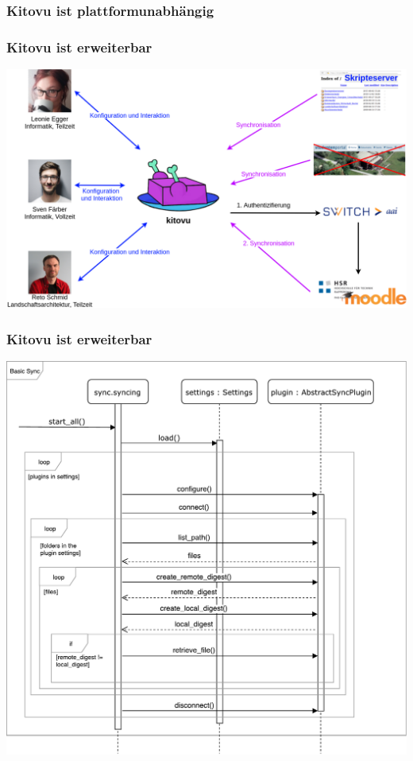 \documentclass{beamer}
\begin{document}
  \begin{frame}
    \frametitle{Kitovu ist plattformunabhängig}
  \end{frame}

  \begin{frame}
    \frametitle{Kitovu ist erweiterbar}
    \includegraphics[width=\linewidth]{../03_End_of_Elaboration/img/kontextdiagramm.png}
  \end{frame}

  \begin{frame}
    \frametitle{Kitovu ist erweiterbar}
    \includegraphics[height=0.9\textheight]{../03_End_of_Elaboration/img/GrobesSequenzDiagramm.pdf}
  \end{frame}
\end{document}
